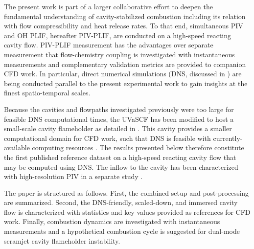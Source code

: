 The present work is part of a larger collaborative effort to deepen the fundamental understanding of cavity-stabilized combustion including its relation with flow compressibility and heat release rates. To that end, simultaneous PIV and OH PLIF, hereafter PIV-PLIF, are conducted on a high-speed reacting cavity flow. PIV-PLIF measurement has the advantages over separate measurement that flow-chemistry coupling is investigated with instantaneous measurements and complementary validation metrics are provided to companion CFD work. In particular, direct numerical simulations (DNS, discussed in \cite{rauch2018dns}) are being conducted parallel to the present experimental work to gain insights at the finest spatio-temporal scales. 

Because the cavities and flowpaths investigated previously were too large for feasible DNS computational times, the UVaSCF \cite{KraussJ.McDaniel1992, McDanielGoyneBrynerEtAl2005} has been modified to host a small-scale cavity flameholder as detailed in \cite{LieberGoyneRockwellEtAl2018a}. This cavity provides a smaller computational domain for CFD work, such that DNS is feasible with currently-available computing resources \cite{rauch2018dns}. The results presented below therefore constitute the first published reference dataset on a high-speed reacting cavity flow that may be computed using DNS. The inflow to the cavity has been characterized with high-resolution PIV in a separate study \cite{LieberThesis}.

The paper is structured as follows. First, the combined setup and post-processing are summarized. Second, the DNS-friendly, scaled-down, and immersed cavity flow is characterized with statistics and key values provided as references for CFD work. Finally, combustion dynamics are investigated with instantaneous measurements and a hypothetical combustion cycle is suggested for dual-mode scramjet cavity flameholder instability.